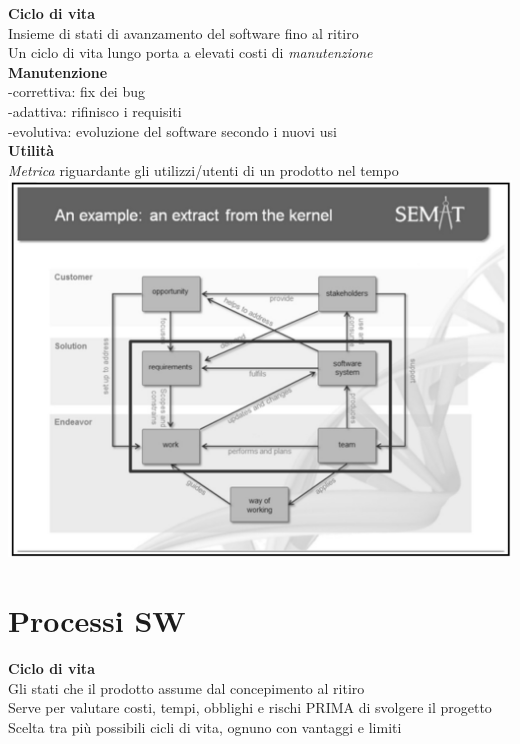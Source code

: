 \documentclass{article}
\begin{document}
		\textbf{Ciclo di vita}\\
		Insieme di stati di avanzamento del software fino al ritiro\\
		Un ciclo di vita lungo porta a elevati costi di \textit{manutenzione}\\
		
		\textbf{Manutenzione}\\
		-correttiva: fix dei bug\\
		-adattiva: rifinisco i requisiti\\
		-evolutiva: evoluzione del software secondo i nuovi usi\\
		
		\textbf{Utilità}\\
		\textit{Metrica} riguardante gli utilizzi/utenti di un prodotto nel tempo\\
		
		\includegraphics[width=14cm]{semat_org.jpg}\\
		
		
	\clearpage
	\section{Processi SW}
		\textbf{Ciclo di vita}\\
		Gli stati che il prodotto assume dal concepimento al ritiro\\
		Serve per valutare costi, tempi, obblighi e rischi PRIMA di svolgere il progetto\\
		Scelta tra più possibili cicli di vita, ognuno con vantaggi e limiti\\
		
\end{document}
